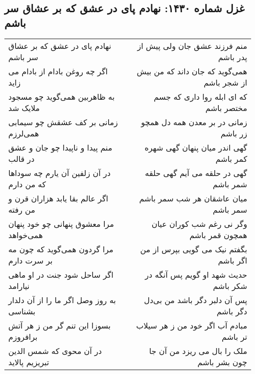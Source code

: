 \begin{center}
\section*{غزل شماره ۱۴۳۰: نهادم پای در عشق که بر عشاق سر باشم}
\label{sec:1430}
\begin{longtable}{l p{0.5cm} r}
نهادم پای در عشق که بر عشاق سر باشم
&&
منم فرزند عشق جان ولی پیش از پدر باشم
\\
اگر چه روغن بادام از بادام می زاید
&&
همی‌گوید که جان داند که من بیش از شجر باشم
\\
به ظاهربین همی‌گوید چو مسجود ملایک شد
&&
که ای ابله روا داری که جسم مختصر باشم
\\
زمانی بر کف عشقش چو سیمابی همی‌لرزم
&&
زمانی در بر معدن همه دل همچو زر باشم
\\
منم پیدا و ناپیدا چو جان و عشق در قالب
&&
گهی اندر میان پنهان گهی شهره کمر باشم
\\
در آن زلفین آن یارم چه سوداها که من دارم
&&
گهی در حلقه می آیم گهی حلقه شمر باشم
\\
اگر عالم بقا یابد هزاران قرن و من رفته
&&
میان عاشقان هر شب سمر باشم سمر باشم
\\
مرا معشوق پنهانی چو خود پنهان همی‌خواهد
&&
وگر نی رغم شب کوران عیان همچون قمر باشم
\\
مرا گردون همی‌گوید که چون مه بر سرت دارم
&&
بگفتم نیک می گویی بپرس از من اگر باشم
\\
اگر ساحل شود جنت در او ماهی نیارامد
&&
حدیث شهد او گویم پس آنگه در شکر باشم
\\
به روز وصل اگر ما را از آن دلدار بشناسی
&&
پس آن دلبر دگر باشد من بی‌دل دگر باشم
\\
بسوزا این تنم گر من ز هر آتش برافروزم
&&
مبادم آب اگر خود من ز هر سیلاب تر باشم
\\
در آن محوی که شمس الدین تبریزیم پالاید
&&
ملک را بال می ریزد من آن جا چون بشر باشم
\\
\end{longtable}
\end{center}
